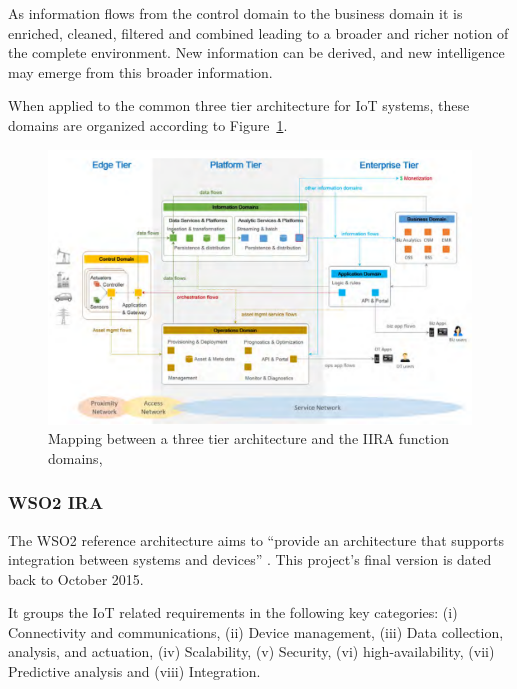 As information flows from the control domain to the business domain it is enriched, cleaned, filtered and combined leading to a broader and richer notion of the complete environment. New information can be derived, and new intelligence may emerge from this broader information.

When applied to the common three tier architecture for IoT systems, these domains are organized according to Figure~\ref{fig:stateofart:arch:iira:applied}.

\begin{figure}[H]
    \centering
    \includegraphics[scale=0.5]{
        assets/figures/irra-applied.png
    }
    \caption[Mapping between a three tier architecture and the \gls{IIRA} function domains]{Mapping between a three tier architecture and the \gls{IIRA} function domains, \cite{iira}}
    \label{fig:stateofart:arch:iira:applied}
\end{figure}

\subsubsection{WSO2 IRA}
\label{subsubsec:stateofart:arch:wso2}

The WSO2 reference architecture aims to ``provide an architecture that supports integration between systems and devices'' \parencite{wso2ira}. This project's final version is dated back to October 2015.

It groups the \gls{IoT} related requirements in the following key categories: (i) Connectivity and communications, (ii) Device management, (iii) Data collection, analysis, and actuation, (iv) Scalability, (v) Security, (vi) high-availability, (vii) Predictive analysis and (viii) Integration.


